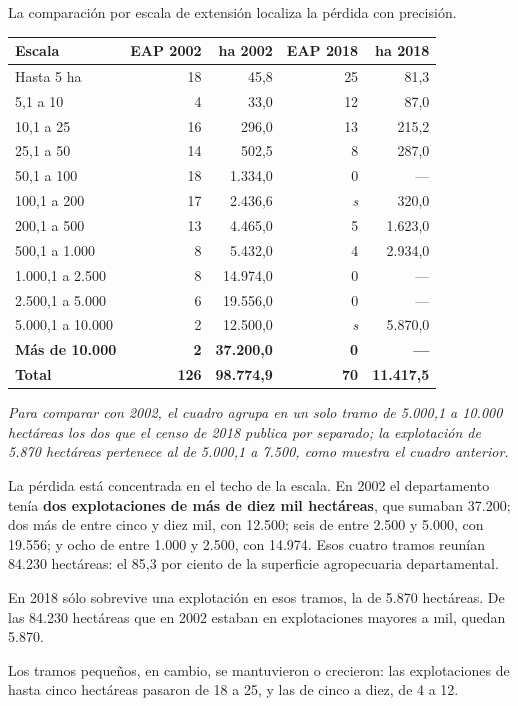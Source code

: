 La comparación por escala de extensión localiza la pérdida con precisión.

{\small
\begin{longtable}{@{}lrrrr@{}}
\toprule
Escala & EAP 2002 & ha 2002 & EAP 2018 & ha 2018 \\
\midrule
\endhead
Hasta 5 ha & 18 & 45,8 & 25 & 81,3 \\
5,1 a 10 & 4 & 33,0 & 12 & 87,0 \\
10,1 a 25 & 16 & 296,0 & 13 & 215,2 \\
25,1 a 50 & 14 & 502,5 & 8 & 287,0 \\
50,1 a 100 & 18 & 1.334,0 & 0 & --- \\
100,1 a 200 & 17 & 2.436,6 & \textit{s} & 320,0 \\
200,1 a 500 & 13 & 4.465,0 & 5 & 1.623,0 \\
500,1 a 1.000 & 8 & 5.432,0 & 4 & 2.934,0 \\
1.000,1 a 2.500 & 8 & 14.974,0 & 0 & --- \\
2.500,1 a 5.000 & 6 & 19.556,0 & 0 & --- \\
5.000,1 a 10.000 & 2 & 12.500,0 & \textit{s} & 5.870,0 \\
\textbf{Más de 10.000} & \textbf{2} & \textbf{37.200,0} & \textbf{0} & \textbf{---} \\
\midrule
\textbf{Total} & \textbf{126} & \textbf{98.774,9} & \textbf{70} & \textbf{11.417,5} \\
\bottomrule
\end{longtable}}

{\small\itshape Para comparar con 2002, el cuadro agrupa en un solo tramo de 5.000,1 a 10.000 hectáreas los dos que el censo de 2018 publica por separado; la explotación de 5.870 hectáreas pertenece al de 5.000,1 a 7.500, como muestra el cuadro anterior.\par}

La pérdida está concentrada en el techo de la escala. En 2002 el departamento tenía \textbf{dos explotaciones de más de diez mil hectáreas}, que sumaban 37.200; dos más de entre cinco y diez mil, con 12.500; seis de entre 2.500 y 5.000, con 19.556; y ocho de entre 1.000 y 2.500, con 14.974. Esos cuatro tramos reunían 84.230 hectáreas: el 85,3 por ciento de la superficie agropecuaria departamental.

En 2018 sólo sobrevive una explotación en esos tramos, la de 5.870 hectáreas. De las 84.230 hectáreas que en 2002 estaban en explotaciones mayores a mil, quedan 5.870.

Los tramos pequeños, en cambio, se mantuvieron o crecieron: las explotaciones de hasta cinco hectáreas pasaron de 18 a 25, y las de cinco a diez, de 4 a 12.

